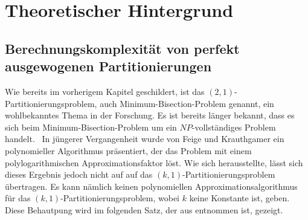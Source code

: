 
\newcommand{\apxalg}{\mathcal{A}}
\newcommand{\oset}[2]{%
    \tikz[baseline=(X.base),inner sep=0pt,outer sep=0pt]{%
        \node[inner sep=0pt,outer sep=0pt] (X) {$#2$}; 
            \node[yshift=1pt] at (X.north) {$#1$};
    }
}
\newcommand{\calS}{\mathcal{S}}
\newcommand{\bbS}{\mathbb{S}}
\newcommand{\tildaS}{\oset{\ \scriptstyle\sim}{\calS}}
\newcommand{\calL}{\mathcal{L}}
\newcommand{\calV}{\mathcal{V}}

\chapter{Theoretischer Hintergrund}\label{chapter:theorie}
\section{Berechnungskomplexität von perfekt ausgewogenen Partitionierungen}\label{sec:complex}
Wie bereits im vorherigem Kapitel geschildert, ist das $(2,1)$\hyp Partitionierungsproblem, auch Minimum-Bisection-Problem genannt, ein wohlbekanntes Thema in der Forschung. 
Es ist bereits länger bekannt, dass es sich beim Minimum-Bisection-Problem um ein $NP$\hyp vollständiges Problem handelt.~\parencite{gj79}
In jüngerer Vergangenheit wurde von Feige und Krauthgamer ein polynomieller Algorithmus präsentiert, der das Problem mit einem polylogarithmischen Approximationsfaktor löst. \parencite{fk02}
Wie sich herausstellte, lässt sich dieses Ergebnis jedoch nicht auf auf das $(k,1)$\hyp Partitionierungsproblem übertragen.
Es kann nämlich keinen polynomiellen Approximationsalgorithmus für das $(k,1)$\hyp Partitionierungsproblem, wobei $k$ keine Konstante ist, geben.
Diese Behautpung wird im folgenden Satz, der aus \parencite{ar06} entnommen ist, gezeigt. 

